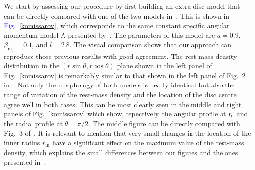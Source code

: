 \documentclass{aa}
\newcommand{\sg}[1]{\textcolor{blue}{#1}}
\begin{document}
We start by assessing our procedure by first building an extra disc model that can be directly compared with one of the two models in~\citet{Komissarov:2006}. This is shown in \sg{Fig.}~\ref{komissarov}, which corresponds to the same constant specific angular momentum model A presented by~\citet{Komissarov:2006}. The parameters of this model are $a=0.9$, $\beta_{\mathrm{m}_{\mathrm{c}}}=0.1$, and $l=2.8$.
The visual comparison shows that our approach can reproduce those previous results with good agreement. The rest-mass density distribution in the $(r\sin\theta,r\cos\theta)$ plane shown in the left panel of Fig.~\ref{komissarov} is remarkably similar to that shown in the left panel of Fig.~2 in~\citet{Komissarov:2006}. Not only the morphology of both models is nearly identical but also the range of variation of the rest-mass density and the location of the disc centre agree well in both cases. This can be most clearly seen in the middle and right panels of Fig.~\ref{komissarov} which show, repectively, the angular profile at $r_{\rm c}$ and the radial profile at $\theta=\pi/2$. The middle figure can be directly compared with Fig.~3 of~\citet{Komissarov:2006}. It is relevant to mention that very small changes in the location of the inner radius $r_{\mathrm{in}}$ have a significant effect on the maximum value of the rest-mass density, which explains the small differences between our figures and the ones presented in~\citet{Komissarov:2006}.
\end{document}
